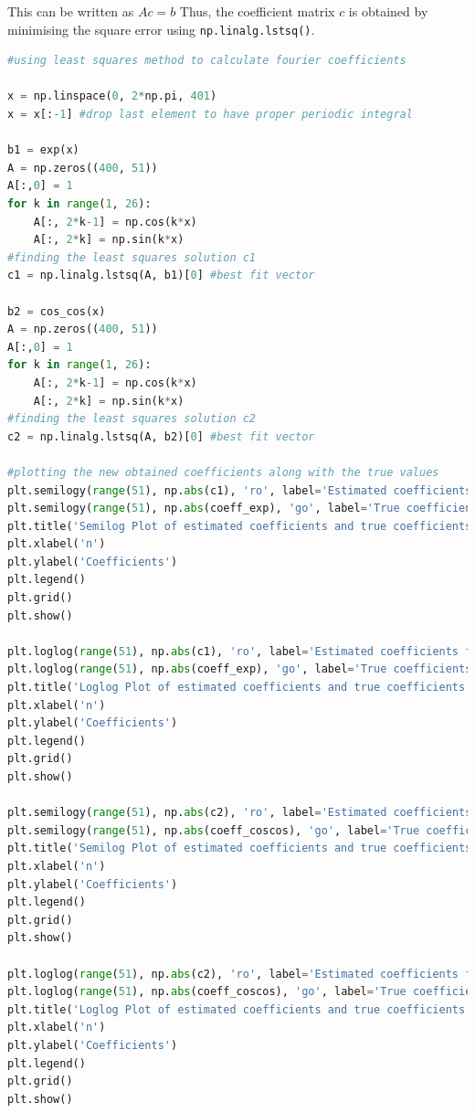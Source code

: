 \documentclass[11pt, a4paper]{article}
\begin{document}
This can be written as $Ac = b$
Thus, the coefficient matrix $c$ is obtained by minimising the square error using \texttt{np.linalg.lstsq()}.

\begin{lstlisting}[language = Python]
#using least squares method to calculate fourier coefficients

x = np.linspace(0, 2*np.pi, 401)
x = x[:-1] #drop last element to have proper periodic integral

b1 = exp(x)
A = np.zeros((400, 51))
A[:,0] = 1
for k in range(1, 26):
    A[:, 2*k-1] = np.cos(k*x)
    A[:, 2*k] = np.sin(k*x)
#finding the least squares solution c1
c1 = np.linalg.lstsq(A, b1)[0] #best fit vector

b2 = cos_cos(x)
A = np.zeros((400, 51))
A[:,0] = 1
for k in range(1, 26):
    A[:, 2*k-1] = np.cos(k*x)
    A[:, 2*k] = np.sin(k*x)
#finding the least squares solution c2
c2 = np.linalg.lstsq(A, b2)[0] #best fit vector

#plotting the new obtained coefficients along with the true values
plt.semilogy(range(51), np.abs(c1), 'ro', label='Estimated coefficients for exp(x)', alpha = 0.5)
plt.semilogy(range(51), np.abs(coeff_exp), 'go', label='True coefficients for exp(x))', alpha = 0.5)
plt.title('Semilog Plot of estimated coefficients and true coefficients vs n for exp(x)')
plt.xlabel('n')
plt.ylabel('Coefficients')
plt.legend()
plt.grid()
plt.show()

plt.loglog(range(51), np.abs(c1), 'ro', label='Estimated coefficients for exp(x)', alpha = 0.5)
plt.loglog(range(51), np.abs(coeff_exp), 'go', label='True coefficients for exp(x),', alpha = 0.5)
plt.title('Loglog Plot of estimated coefficients and true coefficients vs n for exp(x)')
plt.xlabel('n')
plt.ylabel('Coefficients')
plt.legend()
plt.grid()
plt.show()

plt.semilogy(range(51), np.abs(c2), 'ro', label='Estimated coefficients for cos(cos(x))', alpha = 0.5)
plt.semilogy(range(51), np.abs(coeff_coscos), 'go', label='True coefficients for cos(cos(x))', alpha = 0.5)
plt.title('Semilog Plot of estimated coefficients and true coefficients vs n for cos(cos(x))')
plt.xlabel('n')
plt.ylabel('Coefficients')
plt.legend()
plt.grid()
plt.show()

plt.loglog(range(51), np.abs(c2), 'ro', label='Estimated coefficients for cos(cos(x))', alpha = 0.5)
plt.loglog(range(51), np.abs(coeff_coscos), 'go', label='True coefficients for cos(cos(x))', alpha = 0.5)
plt.title('Loglog Plot of estimated coefficients and true coefficients vs n for cos(cos(x))')
plt.xlabel('n')
plt.ylabel('Coefficients')
plt.legend()
plt.grid()
plt.show()


\end{lstlisting}
\end{document}
